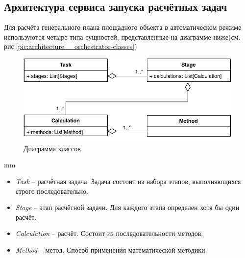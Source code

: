 \subsection*{\large{Архитектура сервиса запуска расчётных задач}}



Для расчёта генерального плана площадного объекта в автоматическом режиме используются четыре типа сущностей,
представленные на диаграмме ниже(см. рис.\ref{pic:architecture__orchestrator-classes})
\begin{figure}[H]
	\includegraphics[width=\textwidth]{architecture/pictures/orchestrator/classes}
	\caption{Диаграмма классов}
	\label{pic:architecture__orchestrator-classes-1}
\end{figure}
 mm

\begin{itemize}
	\item {
		\textit{Task} -- расчётная задача. Задача состоит из набора этапов, выполняющихся строго последовательно.
	}
	\item {
		\textit{Stage} -- этап расчётной задачи. Для каждого этапа определен хотя бы один расчёт.
	}
	\item {
		\textit{Calculation} -- расчёт. Состоит из последовательности методов.
	}
	\item {
		\textit{Method} -- метод. Способ применения математической методики.
	}
\end{itemize}


